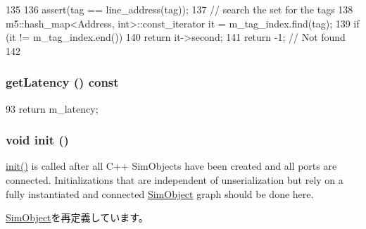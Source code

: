 \begin{DoxyCode}
135 {
136     assert(tag == line_address(tag));
137     // search the set for the tags
138     m5::hash_map<Address, int>::const_iterator it = m_tag_index.find(tag);
139     if (it != m_tag_index.end())
140         return it->second;
141     return -1; // Not found
142 }
\end{DoxyCode}
\hypertarget{classCacheMemory_ae69a59f28f0cfd099bf798cb6bb76356}{
\subsubsection[{getLatency}]{ getLatency () const}}
\label{classCacheMemory_ae69a59f28f0cfd099bf798cb6bb76356}



\begin{DoxyCode}
93 { return m_latency; }
\end{DoxyCode}
\hypertarget{classCacheMemory_a02fd73d861ef2e4aabb38c0c9ff82947}{
\subsubsection[{init}]{\setlength{\rightskip}{0pt plus 5cm}void init ()}}
\label{classCacheMemory_a02fd73d861ef2e4aabb38c0c9ff82947}
\hyperlink{classCacheMemory_a02fd73d861ef2e4aabb38c0c9ff82947}{init()} is called after all C++ SimObjects have been created and all ports are connected. Initializations that are independent of unserialization but rely on a fully instantiated and connected \hyperlink{classSimObject}{SimObject} graph should be done here. 

\hyperlink{classSimObject_a02fd73d861ef2e4aabb38c0c9ff82947}{SimObject}を再定義しています。


